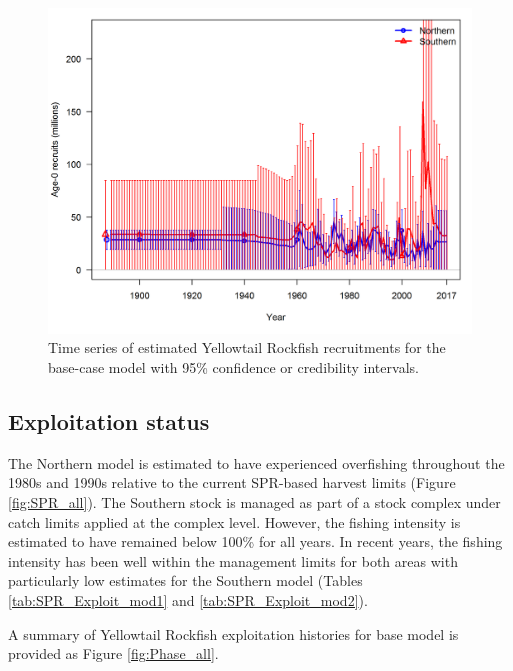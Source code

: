 \documentclass[12pt,]{article}
\begin{document}
\begin{figure}[htbp]
\centering
\includegraphics{r4ss/plots_compare/base_compare8_recruits_uncertainty.png}
\caption{Time series of estimated Yellowtail Rockfish recruitments for
the base-case model with 95\% confidence or credibility intervals.
\label{fig:Recruits_all}}
\end{figure}

\FloatBarrier

\subsection*{Exploitation status}\label{exploitation-status}

The Northern model is estimated to have experienced overfishing
throughout the 1980s and 1990s relative to the current SPR-based harvest
limits (Figure \ref{fig:SPR_all}). The Southern stock is managed as part
of a stock complex under catch limits applied at the complex level.
However, the fishing intensity is estimated to have remained below 100\%
for all years. In recent years, the fishing intensity has been well
within the management limits for both areas with particularly low
estimates for the Southern model (Tables \ref{tab:SPR_Exploit_mod1} and
\ref{tab:SPR_Exploit_mod2}).

A summary of Yellowtail Rockfish exploitation histories for base model
is provided as Figure \ref{fig:Phase_all}.

\FloatBarrier
\end{document}
